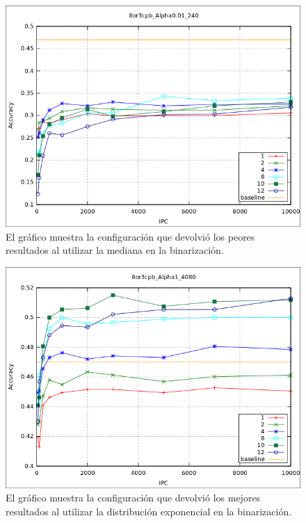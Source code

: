 			\begin{figure}[htbp]
				\centering
				\includegraphics[scale=0.6]{img/resultados/sinteticas/worst_median_8or3cpb_Alpha0,01_240.png}
				\caption[Sintéticas mediana peor resultado]{El gráfico muestra la configuración que devolvió los peores resultados al utilizar la mediana en la binarización.}
				\label{fig: Sinteticas-median-bajo}
			\end{figure}
				
			\begin{figure}[htbp]
				\centering
				\includegraphics[scale=0.6]{img/resultados/sinteticas/best_expon_8or3cpb_Alpha1_4080.png}
				\caption[Sintéticas exponencial mejor resultado]{El gráfico muestra la configuración que devolvió los mejores resultados al utilizar la distribución exponencial en la binarización.}
				\label{fig: Sinteticas-expon-mejor}
			\end{figure}
	
